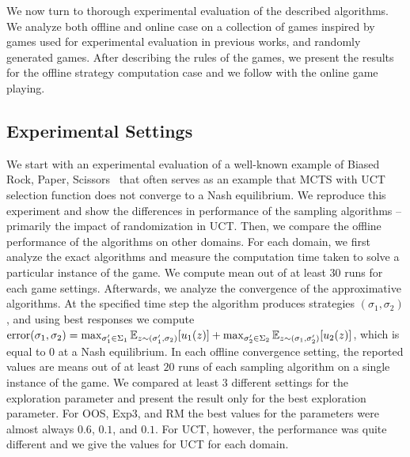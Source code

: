 
We now turn to thorough experimental evaluation of the described algorithms.
We analyze both offline and online case on a collection of games inspired by games used for experimental evaluation in previous works, and randomly generated games.
After describing the rules of the games, we present the results for the offline strategy computation case and we follow with the online game playing.

\subsection{Experimental Settings}


We start with an experimental evaluation of a well-known example of Biased Rock, Paper, Scissors~\cite{Shafiei09} that often serves
as an example that MCTS with UCT selection function does not converge to a Nash equilibrium.
We reproduce this experiment and show the differences in performance of the sampling algorithms -- primarily the impact of randomization in UCT.
Then, we compare the offline performance of the algorithms on other domains.
For each domain, we first analyze the exact algorithms and measure the computation time taken to solve a particular instance of the game.
We compute mean out of at least $30$ runs for each game settings.
Afterwards, we analyze the convergence of the approximative algorithms.
At the specified time step the algorithm produces strategies $(\sigma_1,\sigma_2)$, and using best responses we compute
$\textrm{error}(\sigma_1,\sigma_2) = \max_{\sigma_1' \in \Sigma_1} \mathbb{E}_{z \sim (\sigma_1',\sigma_2)}[u_1(z)]
                                   + \max_{\sigma_2' \in \Sigma_2} \mathbb{E}_{z \sim (\sigma_1,\sigma_2')}[u_2(z)]$,
which is equal to $0$ at a Nash equilibrium.
In each offline convergence setting, the reported values are means out of at least $20$ runs of each sampling algorithm on a single instance of the game.
We compared at least $3$ different settings for the exploration parameter and present the result only for the best exploration parameter.
For OOS, Exp3, and RM the best values for the parameters were almost always $0.6$, $0.1$, and $0.1$.
For UCT, however, the performance was quite different and we give the values for UCT for each domain.


